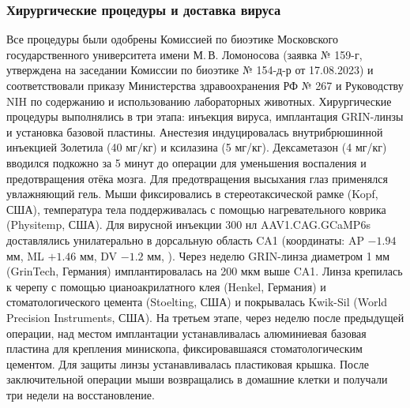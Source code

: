\subsubsection{Хирургические процедуры и доставка вируса}
\label{sec:surgeries}
Все процедуры были одобрены Комиссией по биоэтике Московского государственного университета имени М.\,В. Ломоносова (заявка № 159-г, утверждена на заседании Комиссии по биоэтике № 154-д-р от 17.08.2023) и соответствовали приказу Министерства здравоохранения РФ № 267 и Руководству NIH по содержанию и использованию лабораторных животных.
Хирургические процедуры выполнялись в три этапа: инъекция вируса, имплантация GRIN-линзы и установка базовой пластины. Анестезия индуцировалась внутрибрюшинной инъекцией Золетила (40 мг/кг) и ксилазина (5 мг/кг). Дексаметазон (4 мг/кг) вводился подкожно за 5 минут до операции для уменьшения воспаления и предотвращения отёка мозга. Для предотвращения высыхания глаз применялся увлажняющий гель. Мыши фиксировались в стереотаксической рамке (Kopf, США), температура тела поддерживалась с помощью нагревательного коврика (Physitemp, США). Для вирусной инъекции 300 нл AAV1.CAG.GCaMP6s доставлялись унилатерально в дорсальную область CA1 (координаты: AP $-1.94$ мм, ML $+1.46$ мм, DV $-1.2$ мм, \cite{Paxinos2019}). Через неделю GRIN-линза диаметром 1 мм (GrinTech, Германия) имплантировалась на 200 мкм выше CA1. Линза крепилась к черепу с помощью цианоакрилатного клея (Henkel, Германия) и стоматологического цемента (Stoelting, США) и покрывалась Kwik-Sil (World Precision Instruments, США). На третьем этапе, через неделю после предыдущей операции, над местом имплантации устанавливалась алюминиевая базовая пластина для крепления минископа, фиксировавшаяся стоматологическим цементом. Для защиты линзы устанавливалась пластиковая крышка. После заключительной операции мыши возвращались в домашние клетки и получали три недели на восстановление.

